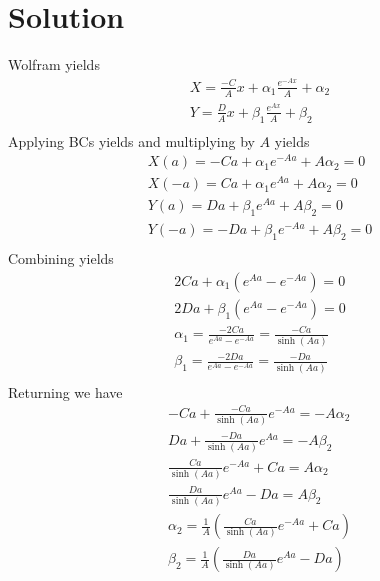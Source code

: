 \documentclass[11pt]{article}
\begin{document}
\section{Solution}
Wolfram yields
\begin{equation}\begin{aligned}
X  = \frac{-C}{A} x + \alpha_1 \frac{e^{-Ax}}{A} + \alpha_2 \\
Y  = \frac{ D}{A} x + \beta_1  \frac{e^{ Ax}}{A} + \beta_2  \\
\end{aligned} \end{equation}
Applying BCs yields and multiplying by $A$ yields
\begin{equation}\begin{aligned}
X(a)  = -C a + \alpha_1 e^{-A a} + A \alpha_2 = 0\\
X(-a) =  C a + \alpha_1 e^{ A a} + A \alpha_2 = 0\\
Y(a)  =  D a + \beta_1  e^{ A a} + A \beta_2  = 0\\
Y(-a) = -D a + \beta_1  e^{-A a} + A \beta_2  = 0\\
\end{aligned} \end{equation}
Combining yields
\begin{equation}\begin{aligned}
2Ca + \alpha_1 (e^{ A a} - e^{-A a}) = 0 \\
2Da + \beta_1  (e^{ A a} - e^{-A a}) = 0 \\
\alpha_1 = \frac{-2Ca}{e^{ A a} - e^{-A a}} = \frac{-Ca}{\sinh(Aa)} \\
\beta_1  = \frac{-2Da}{e^{ A a} - e^{-A a}} = \frac{-Da}{\sinh(Aa)} \\
\end{aligned} \end{equation}
Returning we have
\begin{equation}\begin{aligned}
-C a + \frac{-Ca}{\sinh(Aa)} e^{-A a} = - A \alpha_2 \\
 D a + \frac{-Da}{\sinh(Aa)} e^{ A a} = - A \beta_2  \\
\frac{Ca}{\sinh(Aa)} e^{-A a} +C a = A \alpha_2 \\
\frac{Da}{\sinh(Aa)} e^{ A a} -D a = A \beta_2  \\
\alpha_2 = \frac{1}{A} \left( \frac{Ca}{\sinh(Aa)} e^{-A a} +C a \right) \\
\beta_2  = \frac{1}{A} \left( \frac{Da}{\sinh(Aa)} e^{ A a} -D a \right) \\
\end{aligned} \end{equation}
\end{document}

